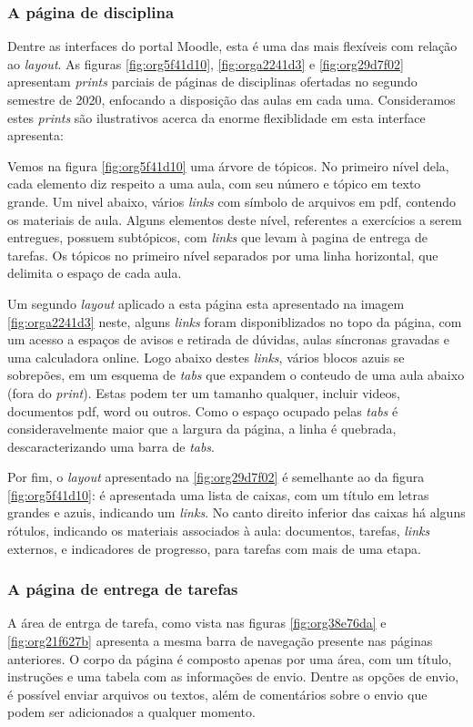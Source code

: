 \documentclass[11pt]{article}
\begin{document}
\subsubsection*{A página de disciplina}
\label{sec:org369fa64}
Dentre as interfaces do portal Moodle, esta é uma das mais flexíveis
com relação ao \emph{layout}.  As figuras \ref{fig:org5f41d10}, \ref{fig:orga2241d3} e
\ref{fig:org29d7f02} apresentam \emph{prints} parciais de páginas de disciplinas
ofertadas no segundo semestre de 2020, enfocando a disposição das
aulas em cada uma. Consideramos estes \emph{prints} são ilustrativos acerca
da enorme flexiblidade em esta interface apresenta:

Vemos na figura \ref{fig:org5f41d10} uma árvore de tópicos. No primeiro nível
dela, cada elemento diz respeito a uma aula, com seu número e tópico
em texto grande.  Um nivel abaixo, vários \emph{links} com símbolo de
arquivos em pdf, contendo os materiais de aula.  Alguns elementos
deste nível, referentes a exercícios a serem entregues, possuem
subtópicos, com \emph{links} que levam à pagina de entrega de tarefas.  Os
tópicos no primeiro nível separados por uma linha horizontal, que
delimita o espaço de cada aula.

Um segundo \emph{layout} aplicado a esta página esta apresentado na imagem
\ref{fig:orga2241d3} neste, alguns \emph{links} foram disponiblizados no topo da
página, com um acesso a espaços de avisos e retirada de dúvidas, aulas
síncronas gravadas e uma calculadora online. Logo abaixo destes \emph{links},
vários blocos azuis se sobrepões, em um esquema de \emph{tabs} que expandem
o conteudo de uma aula abaixo (fora do \emph{print}). Estas podem ter um
tamanho qualquer, incluir videos, documentos pdf, word ou outros. Como
o espaço ocupado pelas \emph{tabs} é consideravelmente maior que a largura
da página, a linha é quebrada, descaracterizando uma barra de \emph{tabs}.

Por fim, o \emph{layout} apresentado na \ref{fig:org29d7f02} é semelhante ao da figura
\ref{fig:org5f41d10}: é apresentada uma lista de caixas, com um título em letras
grandes e azuis, indicando um \emph{links}. No canto direito inferior das
caixas há alguns rótulos, indicando os materiais associados à aula:
documentos, tarefas, \emph{links} externos, e indicadores de progresso,
para tarefas com mais de uma etapa.

\subsubsection*{A página de entrega de tarefas}
\label{sec:org052c70e}
A área de entrga de tarefa, como vista nas figuras \ref{fig:org38e76da} e
\ref{fig:org21f627b} apresenta a mesma barra de navegação presente nas páginas
anteriores. O corpo da página é composto apenas por uma área, com um
título, instruções e uma tabela com as informações de envio. Dentre as
opções de envio, é possível enviar arquivos ou textos, além de
comentários sobre o envio que podem ser adicionados a qualquer
momento.
\end{document}
